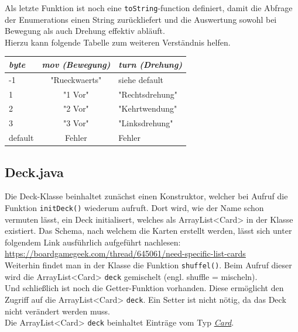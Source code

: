 \documentclass[12pt,a4paper,oneside]{book}
\theoremstyle{plain}
\numberwithin{equation}{chapter} \DeclareMathOperator{\Var}{Var}
\begin{document}
    Als letzte Funktion ist noch eine \texttt{toString}-function definiert, damit die Abfrage der Enumerations einen String zurückliefert und die Auswertung sowohl bei Bewegung als auch Drehung effektiv abläuft.\\
    Hierzu kann folgende Tabelle zum weiteren Verständnis helfen.
    \begin{center} \begin{longtable}{|l|c|l|}
    \hline
    \textit{byte}   & \textit{mov (Bewegung)}           & \textit{turn (Drehung)} \\ \hline
    -1              & "Rueckwaerts"                     & siehe default\\ \hline
    1               & "1 Vor"                           & "Rechtsdrehung"\\\hline
    2               & "2 Vor"                           & "Kehrtwendung"\\\hline
    3               & "3 Vor"                           & "Linksdrehung"\\\hline
    default         & Fehler                            & Fehler\\\hline
    \end{longtable} \end{center}

\subsection{Deck.java}
    Die Deck-Klasse beinhaltet zunächst einen Konstruktor, welcher bei Aufruf die Funktion \texttt{initDeck()} wiederum aufruft. Dort wird, wie der Name schon vermuten lässt, ein Deck initialisert, welches als ArrayList<Card> in der Klasse existiert. Das Schema, nach welchem die Karten erstellt werden, lässt sich unter folgendem Link ausführlich aufgeführt nachlesen:\\
    \hypertarget{cardpriorityLink}{\url{https://boardgamegeek.com/thread/645061/need-specific-list-cards}}\\
    Weiterhin findet man in der Klasse die Funktion \texttt{shuffel()}. Beim Aufruf dieser wird die ArrayList<Card> \texttt{deck} gemischelt (engl. shuffle = mischeln).\\
    Und schließlich ist noch die Getter-Funktion vorhanden. Diese ermöglicht den Zugriff auf die ArrayList<Card> \texttt{deck}. Ein Setter ist nicht nötig, da das Deck nicht verändert werden muss.\\
    Die ArrayList<Card> \texttt{deck} beinhaltet Einträge vom Typ \hyperlink{Card.java}{\textit{Card}}.
  
\end{document}
